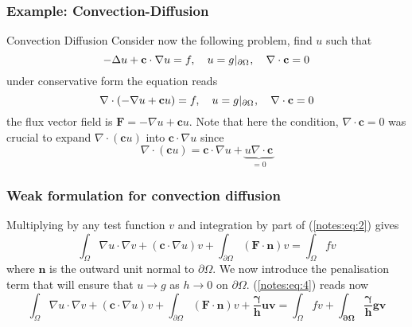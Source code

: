 \subsubsection{Example: Convection-Diffusion}
  \begin{remark}{Convection Diffusion}
    Consider now the following problem, find $u$ such that
    \begin{equation}
      \label{notes:eq:45}
      -\Delta u + \mathbf{c} \cdot \nabla u  = f,\quad u = g|_{\partial {\ensuremath{\Omega^{}}}},\quad \nabla \cdot \mathbf{c} = 0
    \end{equation}
    under conservative form the equation reads
    \begin{equation}
      \label{notes:eq:2}
      \nabla \cdot ( -\nabla u + \mathbf{c} u ) = f,\quad u = g|_{\partial {\ensuremath{\Omega^{}}}},\quad \nabla \cdot \mathbf{c} = 0
    \end{equation}
    the flux vector field is $\mathbf{F}=-\nabla u + \mathbf{c} u$. Note that
    here the condition, $\nabla \cdot \mathbf{c} = 0$ was crucial to
    expand $\nabla \cdot (\mathbf{c} u )$ into $\mathbf{c} \cdot \nabla u$ since
    \begin{equation}
      \label{notes:eq:3}
      \nabla \cdot (\mathbf{c} u ) = \mathbf{c} \cdot \nabla u + \underbrace{u \nabla \cdot \mathbf{c}}_{=0}
    \end{equation}
  \end{remark}


\subsubsection{Weak formulation for convection diffusion}
  Multiplying by any test function $v$ and integration by
  part of (\ref{notes:eq:2}) gives
  \begin{equation}
    \label{notes:eq:4}
    \int_\Omega \nabla u \cdot \nabla v + (\mathbf{c} \cdot \nabla u)v + \int_{\partial \Omega} (\mathbf{F}\cdot \mathbf{n}) v = \int_\Omega f v
  \end{equation}
  where $\mathbf{n}$ is the outward unit normal to $\partial
  \Omega$. We now introduce the penalisation term that will ensure
  that $u \rightarrow g$ as $h \rightarrow 0$ on $\partial \Omega$. (\ref{notes:eq:4}) reads now
  \begin{equation}
    \label{notes:eq:5}
    \int_\Omega \nabla u \cdot \nabla v + (\mathbf{c} \cdot \nabla u)v + \int_{\partial \Omega} (\mathbf{F}\cdot \mathbf{n}) v + \mathbf{\frac{\gamma}{h} u v}  = \int_\Omega f v + \mathbf{\int_{\partial \Omega} \frac{\gamma}{h} g v}
  \end{equation}

